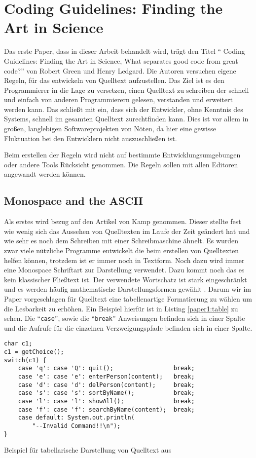 
\section{Coding Guidelines: Finding the Art in Science}
Das erste Paper, dass in dieser Arbeit behandelt wird, trägt den Titel \enquote{ Coding Guidelines: Finding the Art in Science, What separates good code from great code?} von Robert Green und Henry Ledgard\cite{Green}. Die Autoren versuchen eigene Regeln, für das entwickeln von Quelltext aufzustellen. Das Ziel ist es den Programmierer in die Lage zu versetzen, einen Quelltext zu schreiben der schnell und einfach von anderen Programmierern gelesen, verstanden und erweitert werden kann. Das schließt mit ein, dass sich der Entwickler, ohne Kenntnis des Systems, schnell im gesamten Quelltext zurechtfinden kann. Dies ist vor allem in großen, langlebigen Softwareprojekten von Nöten, da hier eine gewisse Fluktuation bei den Entwicklern nicht auszuschließen ist\cite[S. 12]{Green}.

Beim erstellen der Regeln wird nicht auf bestimmte Entwicklungsumgebungen oder andere Tools Rücksicht genommen. Die Regeln sollen mit allen Editoren angewandt werden können.
\subsection{Monospace and the ASCII}
Als erstes wird bezug auf den Artikel von Kamp\cite{Kamp} genommen. Dieser stellte fest wie wenig sich das Aussehen von Quelltexten im Laufe der Zeit geändert hat und wie sehr es noch dem Schreiben mit einer Schreibmaschine ähnelt. Es wurden zwar viele nützliche Programme entwickelt die beim erstellen von Quelltexten helfen können, trotzdem ist er immer noch in Textform. Noch dazu wird immer eine Monospace Schriftart zur Darstellung verwendet. Dazu kommt noch das es kein klassischer Fließtext ist. Der verwendete Wortschatz ist stark eingeschränkt und es werden häufig mathematische Darstellungsformen gewählt \cite[S. 2]{Green}. Darum wir im Paper\cite{Green} vorgeschlagen für Quelltext eine tabellenartige Formatierung zu wählen um die Lesbarkeit zu erhöhen. Ein Beispiel hierfür ist in Listing \ref{paper1:table} zu sehen. Die \enquote{\texttt{case}}, sowie die \enquote{\texttt{break}} Anweisungen befinden sich in einer Spalte und die Aufrufe für die einzelnen Verzweigungspfade befinden sich in einer Spalte.

\begin{listing}[H]
    \begin{verbatim}
char c1;
c1 = getChoice();
switch(c1) {
    case 'q': case 'Q': quit();                 break;
    case 'e': case 'e': enterPerson(content);   break;
    case 'd': case 'd': delPerson(content);     break;
    case 's': case 's': sortByName();           break;
    case 'l': case 'l': showAll();              break;
    case 'f': case 'f': searchByName(content);  break;
    case default: System.out.println(
        "--Invalid Command!!\n");
}
    \end{verbatim}
    \caption{Beispiel für tabellarische Darstellung von Quelltext aus \cite[S. 2]{Green}}
    \label{paper1:table}
\end{listing}



